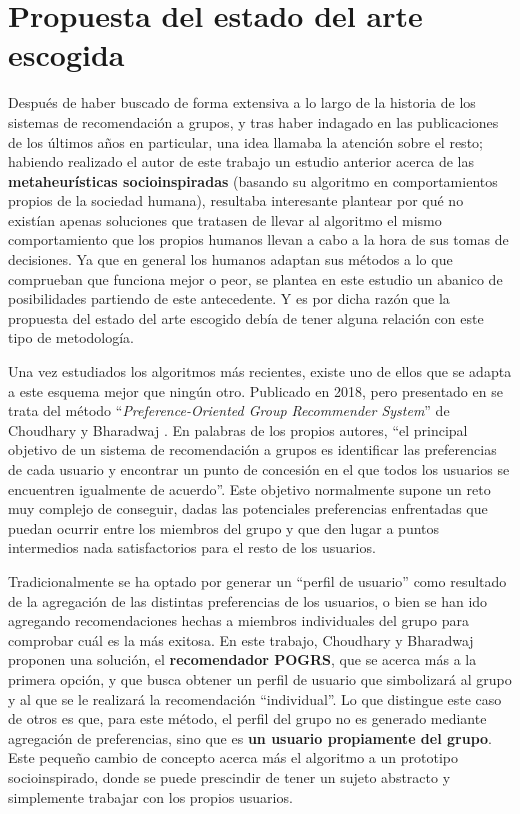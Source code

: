 \section{Propuesta del estado del arte escogida}

Después de haber buscado de forma extensiva a lo largo de la historia de los sistemas de recomendación a grupos, y tras haber indagado en las publicaciones de los últimos años en particular, una idea llamaba la atención sobre el resto; habiendo realizado el autor de este trabajo un estudio anterior acerca de las \textbf{metaheurísticas socioinspiradas} (basando su algoritmo en comportamientos propios de la sociedad humana), resultaba interesante plantear por qué no existían apenas soluciones que tratasen de llevar al algoritmo el mismo comportamiento que los propios humanos llevan a cabo a la hora de sus tomas de decisiones. Ya que en general los humanos adaptan sus métodos a lo que comprueban que funciona mejor o peor, se plantea en este estudio un abanico de posibilidades partiendo de este antecedente. Y es por dicha razón que la propuesta del estado del arte escogido debía de tener alguna relación con este tipo de metodología.

Una vez estudiados los algoritmos más recientes, existe uno de ellos que se adapta a este esquema mejor que ningún otro. Publicado en 2018, pero presentado en se trata del método ``\textit{Preference-Oriented Group Recommender System}'' de Choudhary y Bharadwaj \cite{pogrs}. En palabras de los propios autores, ``el principal objetivo de un sistema de recomendación a grupos es identificar las preferencias de cada usuario y encontrar un punto de concesión en el que todos los usuarios se encuentren igualmente de acuerdo''. Este objetivo normalmente supone un reto muy complejo de conseguir, dadas las potenciales preferencias enfrentadas que puedan ocurrir entre los miembros del grupo y que den lugar a puntos intermedios nada satisfactorios para el resto de los usuarios.

Tradicionalmente se ha optado por generar un ``perfil de usuario'' como resultado de la agregación de las distintas preferencias de los usuarios, o bien se han ido agregando recomendaciones hechas a miembros individuales del grupo para comprobar cuál es la más exitosa. En este trabajo, Choudhary y Bharadwaj proponen una solución, el \textbf{recomendador POGRS}, que se acerca más a la primera opción, y que busca obtener un perfil de usuario que simbolizará al grupo y al que se le realizará la recomendación ``individual''. Lo que distingue este caso de otros es que, para este método, el perfil del grupo no es generado mediante agregación de preferencias, sino que es \textbf{un usuario propiamente del grupo}. Este pequeño cambio de concepto acerca más el algoritmo a un prototipo socioinspirado, donde se puede prescindir de tener un sujeto abstracto y simplemente trabajar con los propios usuarios.

